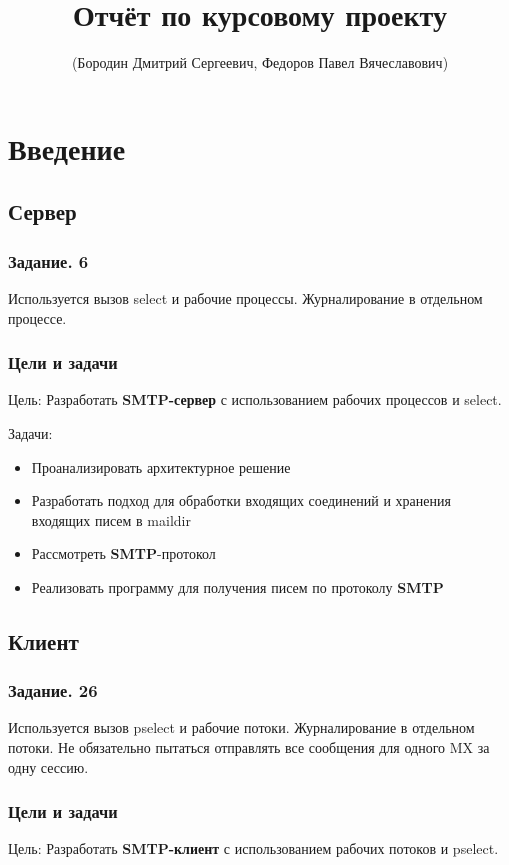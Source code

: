 \documentclass[a4paper,12pt]{report}
\title{Отчёт по курсовому проекту}
\author{(Бородин Дмитрий Сергеевич, Федоров Павел Вячеславович)}
\begin{document}
\maketitle

\tableofcontents

\chapter*{Введение}

\section*{Сервер}

\subsection{Задание. 6}
Используется вызов select и рабочие процессы. Журналирование в отдельном процессе.
\subsection{Цели и задачи}
Цель: 
    Разработать \textbf{SMTP-сервер} с использованием рабочих процессов и select.

Задачи:
\begin{itemize}
    \item Проанализировать архитектурное решение
    \item Разработать подход для обработки входящих соединений и хранения входящих писем в maildir
    \item Рассмотреть \textbf{SMTP}-протокол
    \item Реализовать программу для получения писем по протоколу \textbf{SMTP}
\end{itemize}

\section{Клиент}

\subsection{Задание. 26}
Используется вызов pselect и рабочие потоки. Журналирование в отдельном потоки. Не обязательно пытаться отправлять все сообщения для одного MX за одну сессию.
\subsection{Цели и задачи}
Цель: 
    Разработать \textbf{SMTP-клиент} с использованием рабочих потоков и pselect.
\end{document}
